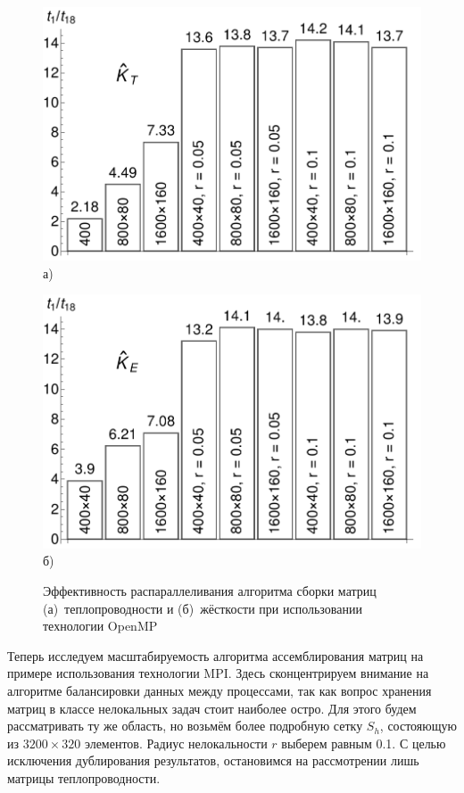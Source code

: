 \begin{figure}[ht]
    \begin{minipage}[b][][b]{0.49\linewidth}\centering
        \includegraphics[width=\linewidth]{pics/OMPThermal.pdf} \\ а)
    \end{minipage}
    \hfill
    \begin{minipage}[b][][b]{0.49\linewidth}\centering
        \includegraphics[width=\linewidth]{pics/OMPMechanical.pdf} \\ б)
    \end{minipage}
    \caption{Эффективность распараллеливания алгоритма сборки матриц (а)~теплопроводности и (б)~жёсткости при использовании технологии OpenMP}
    \label{fig:OMPParallelization}
\end{figure}

Теперь исследуем масштабируемость алгоритма ассемблирования матриц на примере использования технологии MPI. Здесь сконцентрируем внимание на алгоритме балансировки данных между процессами, так как вопрос хранения матриц в классе нелокальных задач стоит наиболее остро. Для этого будем рассматривать ту же область, но возьмём более подробную сетку $S_h$, состояющую из $3200 \times 320$ элементов. Радиус нелокальности $r$ выберем равным 0.1. С целью исключения дублирования результатов, остановимся на рассмотрении лишь матрицы теплопроводности.

